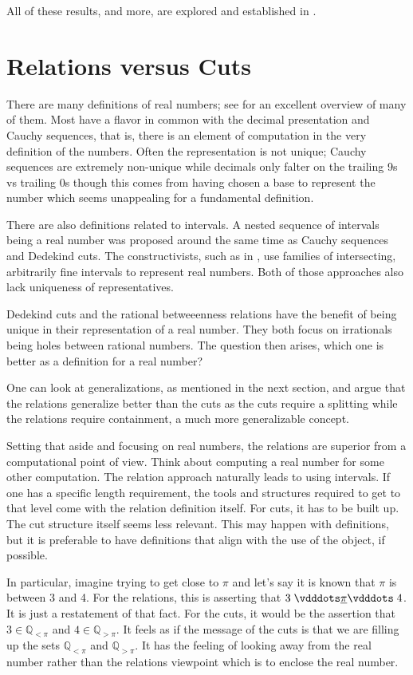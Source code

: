 \documentclass[12pt]{article}
\newcommand{\qcut}[2][x]{\ensuremath{\mathbb{Q}_{#2 #1}}}
\newcommand{\qlt}[1][x]{\qcut[#1]{<}}
\newcommand{\qgt}[1][x]{\qcut[#1]{>}}
\begin{document}
All of these results, and more, are explored and established in \cite{taylor23main}.

\section{Relations versus Cuts}

There are many definitions of real numbers; see \cite{ittay-2015} for an excellent overview of many of them. Most have a flavor in common with the decimal presentation and Cauchy sequences, that is, there is an element of computation in the very definition of the numbers. Often the representation is not unique; Cauchy sequences are extremely non-unique while decimals only falter on the trailing 9s vs trailing 0s though this comes from having chosen a base to represent the number which seems unappealing for a fundamental definition.   

There are also definitions related to intervals. A nested sequence of intervals being a real number was proposed around the same time as Cauchy sequences and Dedekind cuts. The constructivists, such as in \cite{bridger}, use families of intersecting, arbitrarily fine intervals to represent real numbers. Both of those approaches also lack uniqueness of representatives. 

Dedekind cuts and the rational betweeenness relations have the benefit of being unique in their representation of a real number. They both focus on irrationals being holes between rational numbers. The question then arises, which one is better as a definition for a real number? 

One can look at generalizations, as mentioned in the next section, and argue that the relations generalize better than the cuts as the cuts require a splitting while the relations require containment, a much more generalizable concept. 

Setting that aside and focusing on real numbers, the relations are superior from a computational point of view. Think about computing a real number for some other computation. The relation approach naturally leads to using intervals. If one has a specific length requirement, the tools and structures required to get to that level come with the relation definition itself. For cuts, it has to be built up. The cut structure itself seems less relevant. This may happen with definitions, but it is preferable to have definitions that align with the use of the object, if possible. 

In particular, imagine trying to get close to $\pi$ and let's say it is known that $\pi$ is between 3 and 4. For the relations, this is asserting that $3 \xrel[\pi] 4$. It is just a restatement of that fact. For the cuts, it would be the assertion that $3 \in \qlt[\pi]$ and $4 \in \qgt[\pi]$. It feels as if the message of the cuts is that we are filling up the sets $\qlt[\pi]$ and $\qgt[\pi]$. It has the feeling of looking away from the real number rather than the relations viewpoint which is to enclose the real number. 
\end{document}
